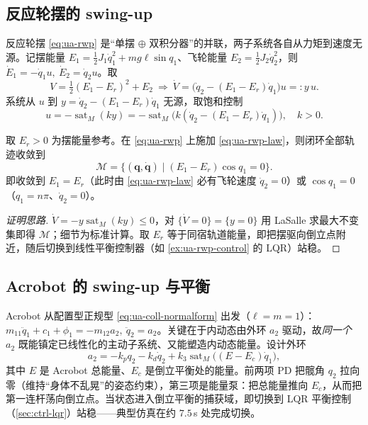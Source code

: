 \subsection{反应轮摆的 swing-up}\label{sec:ua-rwp-swingup}

反应轮摆 \cref{eq:ua-rwp} 是“单摆 $\oplus$ 双积分器”的并联，两子系统各自从力矩到速度无源。记摆能量 $E_1=\tfrac12 J_1\dot{q}_1^2+mg\ell\sin q_1$、飞轮能量 $E_2=\tfrac12 J_2\dot{q}_2^2$，则 $\dot{E}_1=-\dot{q}_1 u,\ \dot{E}_2=\dot{q}_2 u$。取
\begin{equation}\label{eq:ua-rwp-V}
  V=\tfrac12(E_1-E_r)^2+E_2\ \Longrightarrow\ \dot{V}=\big(\dot{q}_2-(E_1-E_r)\dot{q}_1\big)u=:y\,u.
\end{equation}
系统从 $u$ 到 $y=\dot{q}_2-(E_1-E_r)\dot{q}_1$ 无源，取饱和控制
\begin{equation}\label{eq:ua-rwp-law}
  u=-\operatorname{sat}_M(ky)=-\operatorname{sat}_M\!\big(k(\dot{q}_2-(E_1-E_r)\dot{q}_1)\big),\quad k>0.
\end{equation}

\begin{proposition}\label{thm:ua-rwp-conv}
取 $E_r>0$ 为摆能量参考。在 \cref{eq:ua-rwp} 上施加 \cref{eq:ua-rwp-law}，则闭环全部轨迹收敛到
\begin{equation}\label{eq:ua-rwp-set}
  \mathcal{M}=\{(\mathbf{q},\dot{\mathbf{q}})\mid (E_1-E_r)\cos q_1=0\}.
\end{equation}
即收敛到 $E_1=E_r$（此时由 \cref{eq:ua-rwp-law} 必有飞轮速度 $\dot{q}_2=0$）或 $\cos q_1=0$（$q_1=n\pi$、$\dot{q}_2=0$）。
\end{proposition}
\begin{proof}[证明思路]
$\dot{V}=-y\operatorname{sat}_M(ky)\le0$，对 $\{\dot{V}=0\}=\{y=0\}$ 用 LaSalle 求最大不变集即得 $\mathcal{M}$；细节为标准计算。取 $E_r$ 等于同宿轨道能量，即把摆驱向倒立点附近，随后切换到线性平衡控制器（如 \cref{ex:ua-rwp-control} 的 LQR）站稳。
\end{proof}

\subsection{Acrobot 的 swing-up 与平衡}\label{sec:ua-acro-swingup}

Acrobot 从配置型正规型 \cref{eq:ua-coll-normalform} 出发（$\ell=m=1$）：$m_{11}\ddot{q}_1+c_1+\phi_1=-m_{12}a_2,\ \ddot{q}_2=a_2$。关键在于内动态由外环 $a_2$ 驱动，故\emph{同一个} $a_2$ 既能镇定已线性化的主动子系统、又能塑造内动态能量。设计外环
\begin{equation}\label{eq:ua-acro-outer}
  a_2=-k_p q_2-k_d\dot{q}_2+k_3\operatorname{sat}_M\!\big((E-E_c)\dot{q}_1\big),
\end{equation}
其中 $E$ 是 Acrobot 总能量、$E_c$ 是倒立平衡处的能量。前两项 PD 把髋角 $q_2$ 拉向零（维持“身体不乱晃”的姿态约束），第三项是能量泵：把总能量推向 $E_c$，从而把第一连杆荡向倒立点。当状态进入倒立平衡的捕获域，即切换到 LQR 平衡控制（\cref{sec:ctrl-lqr}）站稳——典型仿真在约 $7.5\,$s 处完成切换。

